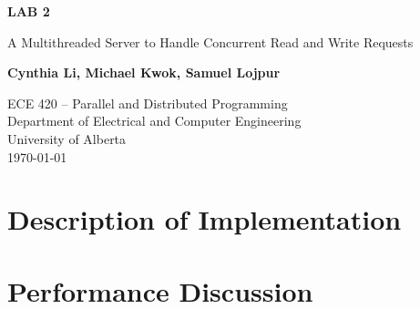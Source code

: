 \documentclass{article}
\begin{document}
    \begin{titlepage}
        \begin{center}
            \vspace*{1cm}

            \textbf{\Large{LAB 2}}

            \vspace{0.5cm}

            \LARGE{A Multithreaded Server to Handle Concurrent Read and Write Requests}

            \vspace{1.5cm}

            \textbf{\Large{Cynthia Li, Michael Kwok, Samuel Lojpur}}

            \vfill

            ECE 420 -- Parallel and Distributed Programming\\
            Department of Electrical and Computer Engineering\\
            University of Alberta\\
            \today

        \end{center}
    \end{titlepage}

    \tableofcontents
    \listoffigures
    \listoftables

    \pagebreak


    \section{Description of Implementation}



    \section{Performance Discussion}

\end{document}
